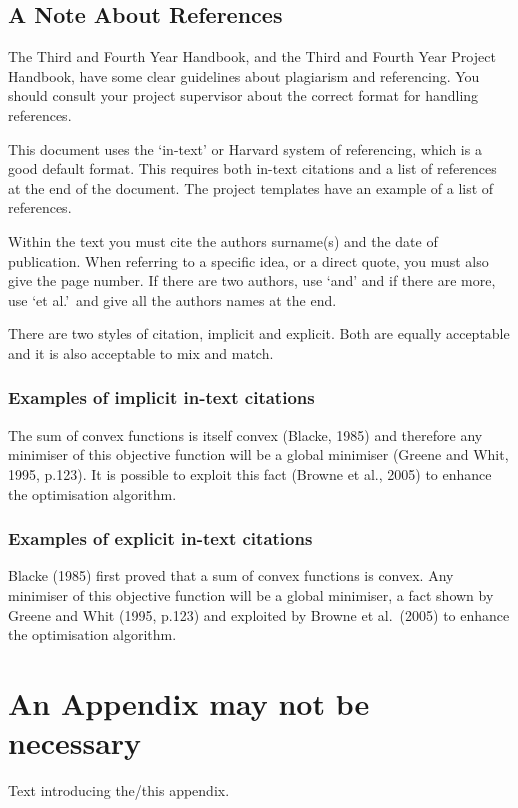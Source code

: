 \documentclass[a4paper, 12pt, notitlepage]{report}
\begin{document}
\section{A Note About References}
%
The Third and Fourth Year Handbook, and the Third and Fourth Year Project Handbook, have some clear guidelines about plagiarism and referencing.
You should consult your project supervisor about the correct format for handling references.

This document uses the `in-text' or Harvard system of referencing, which is a good default format.
This requires both in-text citations and a list of references at the end of the document.
The project templates have an example of a list of references.

Within the text you must cite the authors surname(s) and the date of publication.
When referring to a specific idea, or a direct quote, you must also give the page number.
If there are two authors, use `and' and if there are more, use `et al.'\ and give all the authors names at the end.

There are two styles of citation, implicit and explicit.
Both are equally acceptable and it is also acceptable to mix and match.

\subsection{Examples of implicit in-text citations}
%
The sum of convex functions is itself convex (Blacke, 1985) and therefore any minimiser of this objective function will be a global minimiser (Greene and Whit, 1995, p.123). It is possible to exploit this fact (Browne et al., 2005) to enhance the optimisation algorithm.

\subsection{Examples of explicit in-text citations}
%
Blacke (1985) first proved that a sum of convex functions is convex. Any minimiser of this objective function will be a global minimiser, a fact shown by Greene and Whit (1995, p.123) and exploited by Browne et al.\ (2005) to enhance the optimisation algorithm.

\appendix
\chapter{An Appendix may not be necessary}
%
Text introducing the/this appendix.
\end{document}
